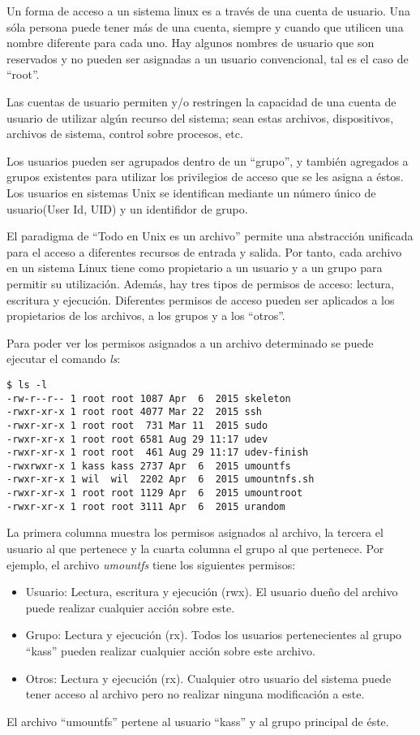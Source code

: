 \documentclass[letterpaper,10pt]{article}
\begin{document}
Un forma de acceso a un sistema linux es a través de una cuenta de usuario. Una sóla persona puede tener más de una cuenta,
siempre y cuando que utilicen una nombre diferente para cada uno. Hay algunos nombres de usuario que son reservados y
no pueden ser asignadas a un usuario convencional, tal es el caso de ``root''.

Las cuentas de usuario permiten y/o restringen la capacidad de una cuenta de usuario de utilizar algún recurso del sistema;
sean estas archivos, dispositivos, archivos de sistema, control sobre procesos, etc.

Los usuarios pueden ser agrupados dentro de un ``grupo'', y también agregados a grupos existentes para utilizar los privilegios
de acceso que se les asigna a éstos.
Los usuarios en sistemas Unix se identifican mediante un número único de usuario(User Id, UID) y un identifidor de grupo.

El paradigma de ``Todo en Unix es un archivo'' permite una abstracción unificada para el acceso a diferentes recursos
de entrada y salida. Por tanto, cada archivo en un sistema Linux tiene como propietario a un usuario y a un grupo para
permitir su utilización. Además, hay tres tipos de permisos de acceso: lectura, escritura y ejecución.
Diferentes permisos de acceso pueden ser aplicados a los propietarios de los archivos, a los grupos y a los ``otros''.

\noindent Para poder ver los permisos asignados a un archivo determinado se puede ejecutar el comando \emph{ls}:
\begin{verbatim}
$ ls -l 
-rw-r--r-- 1 root root 1087 Apr  6  2015 skeleton
-rwxr-xr-x 1 root root 4077 Mar 22  2015 ssh
-rwxr-xr-x 1 root root  731 Mar 11  2015 sudo
-rwxr-xr-x 1 root root 6581 Aug 29 11:17 udev
-rwxr-xr-x 1 root root  461 Aug 29 11:17 udev-finish
-rwxrwxr-x 1 kass kass 2737 Apr  6  2015 umountfs
-rwxr-xr-x 1 wil  wil  2202 Apr  6  2015 umountnfs.sh
-rwxr-xr-x 1 root root 1129 Apr  6  2015 umountroot
-rwxr-xr-x 1 root root 3111 Apr  6  2015 urandom

\end{verbatim}

La primera columna muestra los permisos asignados al archivo, la tercera el usuario al que pertenece y la cuarta
columna el grupo al que pertenece. Por ejemplo, el archivo \emph{umountfs} tiene los siguientes permisos:
\begin{itemize}
  \item Usuario: Lectura, escritura y ejecución (rwx). El usuario dueño del archivo puede realizar cualquier acción sobre este.
  \item Grupo: Lectura y ejecución (rx). Todos los usuarios pertenecientes al grupo ``kass'' pueden realizar cualquier acción sobre este archivo.
  \item Otros: Lectura y ejecución (rx). Cualquier otro usuario del sistema puede tener acceso al archivo pero no realizar ninguna modificación a este.
\end{itemize}
El archivo ``umountfs'' pertene al usuario ``kass'' y al grupo principal de éste.
\end{document}
